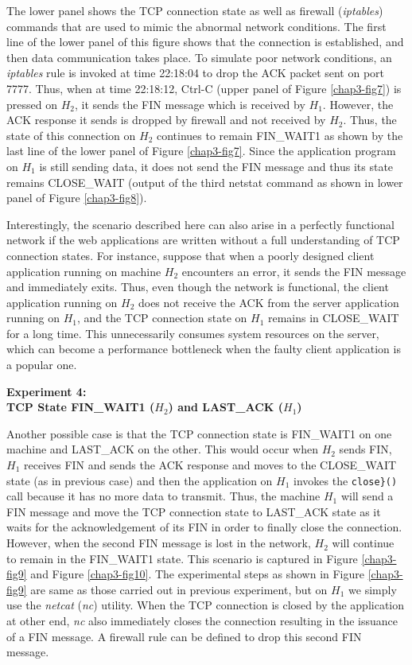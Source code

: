 \begin{multicols}{2}
\noindent
The lower panel shows the TCP connection state as well as firewall (\textit{iptables}) commands that are used to mimic the abnormal network conditions. The first line of the lower panel of this figure shows that the connection is established, and then data communication takes place. To simulate poor network conditions, an \textit{iptables} rule is invoked at time 22:18:04 to drop the ACK packet sent on port 7777. Thus, when at time 22:18:12, Ctrl-C (upper panel of Figure \ref{chap3-fig7}) is pressed on $H_{2}$, it sends the FIN message which is received by $H_{1}$. However, the ACK response it sends is dropped by firewall and not received by $H_{2}$. Thus, the state of this connection on $H_{2}$ continues to remain FIN\_WAIT1 as shown by the last line of the lower panel of Figure \ref{chap3-fig7}. Since the application program on $H_{1}$ is still sending data, it does not send the FIN message and thus its state remains CLOSE\_WAIT (output of the third netstat command as shown in lower panel of Figure \ref{chap3-fig8}).


Interestingly, the scenario described here can also arise in a perfectly functional network if the web applications are written without a full understanding of TCP connection states. For instance, suppose that when a poorly designed client application running on machine $H_{2}$ encounters an error, it sends the FIN message and immediately exits. Thus, even though the network is functional, the client application running on $H_{2}$ does not receive the ACK from the server application running on $H_{1}$, and the TCP connection state on $H_{1}$ remains in CLOSE\_WAIT for a long time. This unnecessarily consumes system resources on the server, which can become a performance bottleneck when the faulty client application is a popular one.

\newpage

\noindent
\textbf{Experiment 4:\\ TCP State FIN\_WAIT1 (\boldmath$H_{2}$) and LAST\_ACK ($H_{1}$)}

Another possible case is that the TCP connection state is FIN\_WAIT1 on one machine and LAST\_ACK on the other. This would occur when $H_{2}$ sends FIN, $H_{1}$ receives FIN and sends the ACK response and moves to the CLOSE\_WAIT state (as in previous case) and then the application on $H_{1}$ invokes the \lstinline|close}()| call because it has no more data to transmit. Thus, the machine $H_{1}$ will send a FIN message and move the TCP connection state to LAST\_ACK state as it waits for the acknowledgement of its FIN in order to finally close the connection. However, when the second FIN message is lost in the network, $H_{2}$ will continue to remain in the FIN\_WAIT1 state. This scenario is captured in Figure \ref{chap3-fig9} and Figure \ref{chap3-fig10}. The experimental steps as shown in Figure \ref{chap3-fig9} are same as those carried out in previous experiment, but on $H_{1}$ we simply use the \textit{netcat} (\textit{nc}) utility. When the TCP connection is closed by the application at other end, \textit{nc} also immediately closes the connection resulting in the issuance of a FIN message. A firewall rule can be defined to drop this second FIN message.


\end{multicols}
